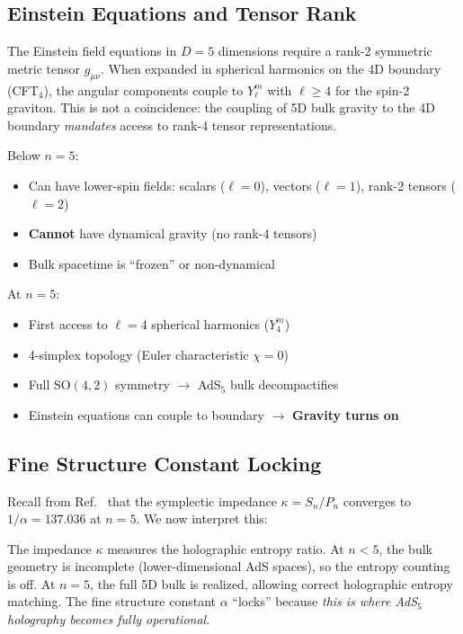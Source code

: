 \documentclass[aps,prd,twocolumn,superscriptaddress,floatfix]{revtex4-2}
\newcommand{\SO}{\ensuremath{\text{SO}}}
\begin{document}
\subsection{Einstein Equations and Tensor Rank}

The Einstein field equations in $D=5$ dimensions require a rank-2 symmetric metric tensor $g_{\mu\nu}$. When expanded in spherical harmonics on the 4D boundary (CFT$_4$), the angular components couple to $Y_{\ell}^m$ with $\ell \geq 4$ for the spin-2 graviton. This is not a coincidence: the coupling of 5D bulk gravity to the 4D boundary \emph{mandates} access to rank-4 tensor representations.

Below $n=5$:
\begin{itemize}
\item Can have lower-spin fields: scalars ($\ell=0$), vectors ($\ell=1$), rank-2 tensors ($\ell=2$)
\item \textbf{Cannot} have dynamical gravity (no rank-4 tensors)
\item Bulk spacetime is ``frozen'' or non-dynamical
\end{itemize}

At $n=5$:
\begin{itemize}
\item First access to $\ell=4$ spherical harmonics ($Y_4^m$)
\item 4-simplex topology (Euler characteristic $\chi = 0$)
\item Full $\SO(4,2)$ symmetry $\to$ AdS$_5$ bulk decompactifies
\item Einstein equations can couple to boundary $\to$ \textbf{Gravity turns on}
\end{itemize}

\subsection{Fine Structure Constant Locking}

Recall from Ref.~\cite{companion_alpha} that the symplectic impedance $\kappa = S_n/P_n$ converges to $1/\alpha = 137.036$ at $n=5$. We now interpret this:

The impedance $\kappa$ measures the holographic entropy ratio. At $n < 5$, the bulk geometry is incomplete (lower-dimensional AdS spaces), so the entropy counting is off. At $n=5$, the full 5D bulk is realized, allowing correct holographic entropy matching. The fine structure constant $\alpha$ ``locks'' because \textit{this is where AdS$_5$ holography becomes fully operational}.
\end{document}
